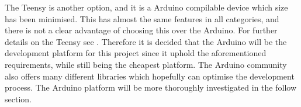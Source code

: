The Teensy is another option, and it is a Arduino compilable device which size has been minimised.
This has almost the same features in all categories, and there is not a clear advantage of choosing this over the Arduino.
For further details on the Teensy see \cite{TeensyIsDopeMan}.  
Therefore it is decided that the Arduino will be the development platform for this project since it uphold the aforementioned requirements, while still being the cheapest platform.
The Arduino community also offers many different libraries which hopefully can optimise the development process.
The Arduino platform will be more thoroughly investigated in the follow section.
